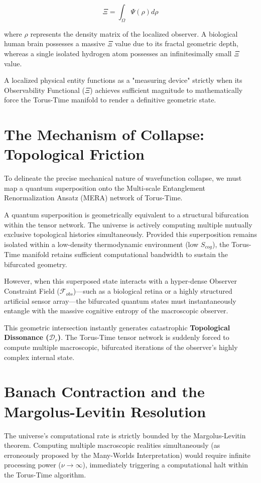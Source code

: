 \documentclass[12pt,openany]{book}
\begin{document}
\begin{equation}
\Xi = \int_\Omega \Psi(\rho) d\rho
\end{equation}

where $\rho$ represents the density matrix of the localized observer. A biological human brain possesses a massive $\Xi$ value due to its fractal geometric depth, whereas a single isolated hydrogen atom possesses an infinitesimally small $\Xi$ value. 

A localized physical entity functions as a "measuring device" strictly when its Observability Functional ($\Xi$) achieves sufficient magnitude to mathematically force the Torus-Time manifold to render a definitive geometric state. 

\section{The Mechanism of Collapse: Topological Friction}
To delineate the precise mechanical nature of wavefunction collapse, we must map a quantum superposition onto the Multi-scale Entanglement Renormalization Ansatz (MERA) network of Torus-Time.

A quantum superposition is geometrically equivalent to a structural bifurcation within the tensor network. The universe is actively computing multiple mutually exclusive topological histories simultaneously. Provided this superposition remains isolated within a low-density thermodynamic environment (low $S_{cog}$), the Torus-Time manifold retains sufficient computational bandwidth to sustain the bifurcated geometry.

However, when this superposed state interacts with a hyper-dense Observer Constraint Field ($\mathcal{F}_{obs}$)---such as a biological retina or a highly structured artificial sensor array---the bifurcated quantum states must instantaneously entangle with the massive cognitive entropy of the macroscopic observer. 

This geometric intersection instantly generates catastrophic \textbf{Topological Dissonance ($\mathcal{D}_r$)}. The Torus-Time tensor network is suddenly forced to compute multiple macroscopic, bifurcated iterations of the observer's highly complex internal state. 

\section{Banach Contraction and the Margolus-Levitin Resolution}
The universe's computational rate is strictly bounded by the Margolus-Levitin theorem. Computing multiple macroscopic realities simultaneously (as erroneously proposed by the Many-Worlds Interpretation) would require infinite processing power ($\nu \to \infty$), immediately triggering a computational halt within the Torus-Time algorithm.
\end{document}
